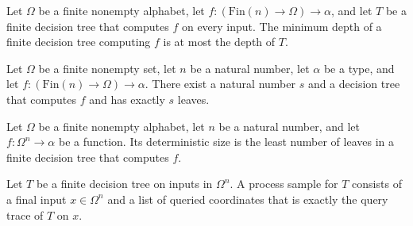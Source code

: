 \begin{theorem}
\label{FABL.FiniteDecisionTree.deterministicDepth_le_of_computes}
\leanok
{}
Let $\Omega$ be a finite nonempty alphabet, let $f:(\mathrm{Fin}(n)\to\Omega)\to\alpha$,
and let $T$ be a finite decision tree that computes $f$ on every input. The minimum
depth of a finite decision tree computing $f$ is at most the depth of $T$.
\end{theorem}

\begin{theorem}
\label{FABL.FiniteDecisionTree.exists_computingTree_with_leafCount}
\leanok
{}
Let $\Omega$ be a finite nonempty set, let $n$ be a natural number, let $\alpha$ be a
type, and let $f:(\mathrm{Fin}(n)\to\Omega)\to\alpha$. There exist a natural number $s$
and a decision tree that computes $f$ and has exactly $s$ leaves.
\end{theorem}

\begin{definition}
\label{FABL.FiniteDecisionTree.deterministicSize}
\leanok
{}
Let $\Omega$ be a finite nonempty alphabet, let $n$ be a natural number, and let $f :
\Omega^n \to \alpha$ be a function. Its deterministic size is the least number of leaves
in a finite decision tree that computes $f$.
\end{definition}

\begin{definition}
\label{FABL.FiniteDecisionTree.ProcessSample}
\leanok
{}
Let $T$ be a finite decision tree on inputs in $\Omega^n$. A process sample for $T$
consists of a final input $x \in \Omega^n$ and a list of queried coordinates that is
exactly the query trace of $T$ on $x$.
\end{definition}

